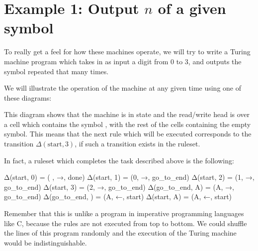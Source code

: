 \section{Example 1: Output $n$ of a given symbol}

To really get a feel for how these machines operate, we will try to write a Turing machine program which takes in as input a digit from 0 to 3, and outputs the symbol  repeated that many times.

We will illustrate the operation of the machine at any given time using one of these diagrams:

\begin{center}
\end{center}

This diagram shows that the machine is in state  and the read/write head is over a cell which contains the symbol , with the rest of the cells containing the empty symbol. This means that the next rule which will be executed corresponds to the transition $\Delta(\textrm{start}, \textrm{3})$, if such a transition exists in the ruleset.

In fact, a ruleset which completes the task described above is the following:

\begin{stdout}
Δ(start, 0) = ( , →, done) 
Δ(start, 1) = (0, →, go_to_end)
Δ(start, 2) = (1, →, go_to_end)
Δ(start, 3) = (2, →, go_to_end)
Δ(go_to_end, A) = (A, →, go_to_end)
Δ(go_to_end, ) = (A, ←, start)
Δ(start, A) = (A, ←, start)
\end{stdout}

Remember that this is unlike a program in imperative programming languages like C, because the rules are not executed from top to bottom. We could shuffle the lines of this program randomly and the execution of the Turing machine would be indistinguishable.

